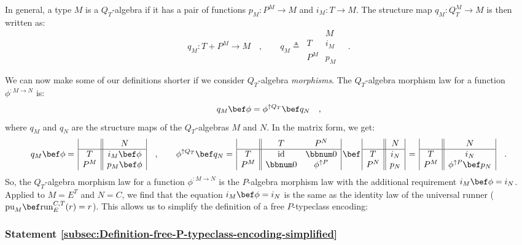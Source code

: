 In general, a type $M$ is a $Q_{T}$-algebra if it has a pair of
functions $p_{M}:P^{M}\rightarrow M$ and $i_{M}:T\rightarrow M$.
The structure map $q_{M}:Q_{T}^{M}\rightarrow M$ is then written
as:
\[
q_{M}:T+P^{M}\rightarrow M\quad,\quad\quad q_{M}\triangleq\,\begin{array}{|c||c|}
 & M\\
\hline T & i_{M}\\
P^{M} & p_{M}
\end{array}\quad.
\]

We can now make some of our definitions shorter if we consider $Q_{T}$-algebra
\emph{morphisms}. The $Q_{T}$-algebra morphism law for a function
$\phi^{:M\rightarrow N}$ is:
\[
q_{M}\bef\phi=\phi^{\uparrow Q_{T}}\bef q_{N}\quad,
\]
where $q_{M}$ and $q_{N}$ are the structure maps of the $Q_{T}$-algebras
$M$ and $N$. In the matrix form, we get:
\[
q_{M}\bef\phi=\,\begin{array}{|c||c|}
 & N\\
\hline T & i_{M}\bef\phi\\
P^{M} & p_{M}\bef\phi
\end{array}\quad,\quad\quad\phi^{\uparrow Q_{T}}\bef q_{N}=\,\begin{array}{|c||cc|}
 & T & P^{N}\\
\hline T & \text{id} & \bbnum 0\\
P^{M} & \bbnum 0 & \phi^{\uparrow P}
\end{array}\,\bef\,\begin{array}{|c||c|}
 & N\\
\hline T & i_{N}\\
P^{N} & p_{N}
\end{array}\,=\,\begin{array}{|c||c|}
 & N\\
\hline T & i_{N}\\
P^{M} & \phi^{\uparrow P}\bef p_{N}
\end{array}\quad.
\]
So, the $Q_{T}$-algebra morphism law for a function $\phi^{:M\rightarrow N}$
is the $P$-algebra morphism law with the additional requirement $i_{M}\bef\phi=i_{N}$.
Applied to $M=E^{T}$ and $N=C$, we find that the equation $i_{M}\bef\phi=i_{N}$
is the same as the identity law of the universal runner ($\text{pu}_{M}\bef\text{run}_{E}^{C,T}(r)=r$).
This allows us to simplify the definition of a free $P$-typeclass
encoding:

\subsubsection{Statement \label{subsec:Definition-free-P-typeclass-encoding-simplified}\ref{subsec:Definition-free-P-typeclass-encoding-simplified}}

